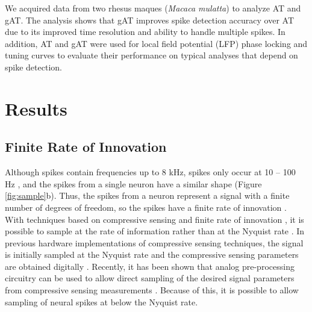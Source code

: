 \documentclass[10 pt]{article}
\begin{document}
We acquired data from two rhesus maques (\textit{Macaca mulatta}) \cite{RBB2012} to analyze AT and gAT. %
The analysis shows that gAT improves spike detection accuracy over AT due to its improved time resolution and ability to handle multiple spikes.
In addition, AT and gAT were used for local field potential (LFP) phase locking \cite{???} and tuning curves \cite{???} to evaluate their performance on typical analyses that depend on spike detection.



\section{Results}

\subsection{Finite Rate of Innovation}

Although spikes contain frequencies up to 8 kHz, spikes only occur at 10 -- 100 Hz \cite{???}, and the spikes from a single neuron have a similar shape \cite{???} (Figure \ref{fig:sample}b).
Thus, the spikes from a neuron represent a signal with a finite number of degrees of freedom, so the spikes have a finite rate of innovation \cite{VMB2002}.
With techniques based on compressive sensing \cite{???} and finite rate of innovation \cite{???}, it is possible to sample at the rate of information rather than at the Nyquist rate \cite{???}.
In previous hardware implementations of compressive sensing techniques, the signal is initially sampled at the Nyquist rate and the compressive sensing parameters are obtained digitally \cite{???}.
Recently, it has been shown that analog pre-processing circuitry can be used to allow direct sampling of the desired signal parameters from compressive sensing measurements \cite{YBM2012}.
Because of this, it is possible to allow sampling of neural spikes at below the Nyquist rate.
\end{document}
